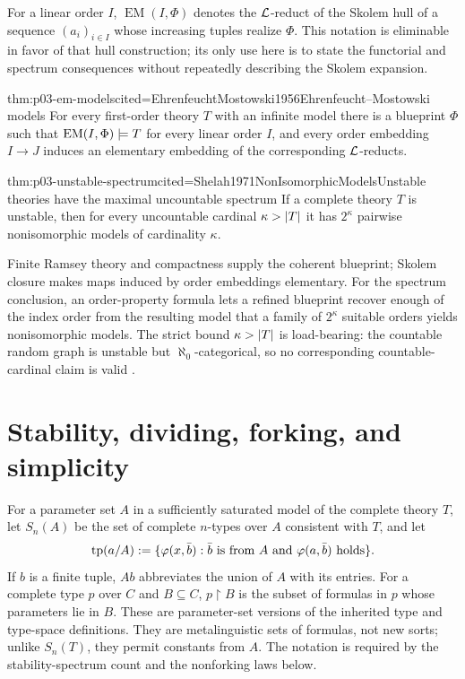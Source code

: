 For a linear order \(I\), \(\operatorname{EM}(I,\Phi)\) denotes the
\(\mathcal{L}\)-reduct of the Skolem hull of a sequence
\((a_i)_{i\in I}\) whose increasing tuples realize \(\Phi\).  This notation
is eliminable in favor of that hull construction; its only use here is to
state the functorial and spectrum consequences without repeatedly describing
the Skolem expansion.

\begin{hbtheorem}{thm:p03-em-models}{cited=EhrenfeuchtMostowski1956}{Ehrenfeucht--Mostowski models}
For every first-order theory \(T\) with an infinite model there is a blueprint
\(\Phi\) such that \(\operatorname{EM}(I,\Phi)\models T\) for every linear
order \(I\), and every order embedding \(I\to J\) induces an elementary
embedding of the corresponding \(\mathcal{L}\)-reducts.
\end{hbtheorem}

\begin{hbtheorem}{thm:p03-unstable-spectrum}{cited=Shelah1971NonIsomorphicModels}{Unstable theories have the maximal uncountable spectrum}
If a complete theory \(T\) is unstable, then for every uncountable cardinal
\(\kappa>\lvert T\rvert\) it has \(2^\kappa\) pairwise nonisomorphic models of
cardinality \(\kappa\).
\end{hbtheorem}

Finite Ramsey theory and compactness supply the coherent blueprint; Skolem
closure makes maps induced by order embeddings elementary.  For the spectrum
conclusion, an order-property formula lets a refined blueprint recover enough
of the index order from the resulting model that a family of
\(2^\kappa\) suitable orders yields nonisomorphic models.  The strict bound
\(\kappa>\lvert T\rvert\) is load-bearing: the countable random graph is unstable but
\(\aleph_0\)-categorical, so no corresponding countable-cardinal claim is
valid \cite{EhrenfeuchtMostowski1956,Shelah1971NonIsomorphicModels,Hodges1993}.

\section{Stability, dividing, forking, and simplicity}
\label{sec:p03-stability}

For a parameter set \(A\) in a sufficiently saturated model of the complete
theory \(T\), let \(S_n(A)\) be the set of complete \(n\)-types over \(A\)
consistent with \(T\), and let
\[
\operatorname{tp}(a/A)
\mathrel{:=}\{\varphi(x,\bar b):\bar b\text{ is from }A
              \text{ and }\varphi(a,\bar b)\text{ holds}\}.
\]
If \(b\) is a finite tuple, \(Ab\) abbreviates the union of \(A\) with its
entries.  For a complete type \(p\) over \(C\) and \(B\subseteq C\),
\(p\mathbin{\upharpoonright}B\) is the subset of formulas in \(p\) whose
parameters lie in \(B\).
These are parameter-set versions of the inherited type and type-space
definitions.  They are metalinguistic sets of formulas, not new sorts; unlike
\(S_n(T)\), they permit constants from \(A\).  The notation is required by
the stability-spectrum count and the nonforking laws below.

